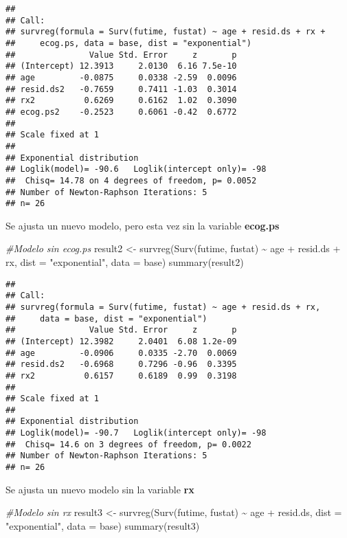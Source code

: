\documentclass[
]{article}
\newenvironment{Shaded}{\begin{snugshade}}{\end{snugshade}}
\newcommand{\AttributeTok}[1]{\textcolor[rgb]{0.77,0.63,0.00}{#1}}
\newcommand{\CommentTok}[1]{\textcolor[rgb]{0.56,0.35,0.01}{\textit{#1}}}
\newcommand{\FunctionTok}[1]{\textcolor[rgb]{0.00,0.00,0.00}{#1}}
\newcommand{\NormalTok}[1]{#1}
\newcommand{\OtherTok}[1]{\textcolor[rgb]{0.56,0.35,0.01}{#1}}
\newcommand{\SpecialCharTok}[1]{\textcolor[rgb]{0.00,0.00,0.00}{#1}}
\newcommand{\StringTok}[1]{\textcolor[rgb]{0.31,0.60,0.02}{#1}}
\begin{document}
\begin{verbatim}
## 
## Call:
## survreg(formula = Surv(futime, fustat) ~ age + resid.ds + rx + 
##     ecog.ps, data = base, dist = "exponential")
##               Value Std. Error     z       p
## (Intercept) 12.3913     2.0130  6.16 7.5e-10
## age         -0.0875     0.0338 -2.59  0.0096
## resid.ds2   -0.7659     0.7411 -1.03  0.3014
## rx2          0.6269     0.6162  1.02  0.3090
## ecog.ps2    -0.2523     0.6061 -0.42  0.6772
## 
## Scale fixed at 1 
## 
## Exponential distribution
## Loglik(model)= -90.6   Loglik(intercept only)= -98
##  Chisq= 14.78 on 4 degrees of freedom, p= 0.0052 
## Number of Newton-Raphson Iterations: 5 
## n= 26
\end{verbatim}

Se ajusta un nuevo modelo, pero esta vez sin la variable
\textbf{ecog.ps}

\begin{Shaded}
\begin{Highlighting}[]
\CommentTok{\#Modelo sin ecog.ps}
\NormalTok{result2 }\OtherTok{\textless{}{-}} \FunctionTok{survreg}\NormalTok{(}\FunctionTok{Surv}\NormalTok{(futime, fustat) }\SpecialCharTok{\textasciitilde{}}\NormalTok{ age }\SpecialCharTok{+}\NormalTok{ resid.ds }\SpecialCharTok{+}\NormalTok{ rx, }\AttributeTok{dist =} \StringTok{"exponential"}\NormalTok{, }\AttributeTok{data =}\NormalTok{ base)}
\FunctionTok{summary}\NormalTok{(result2)}
\end{Highlighting}
\end{Shaded}

\begin{verbatim}
## 
## Call:
## survreg(formula = Surv(futime, fustat) ~ age + resid.ds + rx, 
##     data = base, dist = "exponential")
##               Value Std. Error     z       p
## (Intercept) 12.3982     2.0401  6.08 1.2e-09
## age         -0.0906     0.0335 -2.70  0.0069
## resid.ds2   -0.6968     0.7296 -0.96  0.3395
## rx2          0.6157     0.6189  0.99  0.3198
## 
## Scale fixed at 1 
## 
## Exponential distribution
## Loglik(model)= -90.7   Loglik(intercept only)= -98
##  Chisq= 14.6 on 3 degrees of freedom, p= 0.0022 
## Number of Newton-Raphson Iterations: 5 
## n= 26
\end{verbatim}

Se ajusta un nuevo modelo sin la variable \textbf{rx}

\begin{Shaded}
\begin{Highlighting}[]
\CommentTok{\#Modelo sin rx}
\NormalTok{result3 }\OtherTok{\textless{}{-}} \FunctionTok{survreg}\NormalTok{(}\FunctionTok{Surv}\NormalTok{(futime, fustat) }\SpecialCharTok{\textasciitilde{}}\NormalTok{ age }\SpecialCharTok{+}\NormalTok{ resid.ds, }\AttributeTok{dist =} \StringTok{"exponential"}\NormalTok{, }\AttributeTok{data =}\NormalTok{ base)}
\FunctionTok{summary}\NormalTok{(result3)}
\end{Highlighting}
\end{Shaded}
\end{document}
